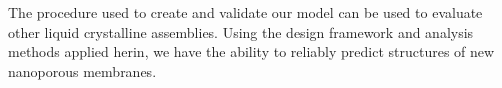 The procedure used to create and validate our model can be used
to evaluate other liquid crystalline assemblies. Using the design 
framework and analysis methods applied herin, we have the ability 
to reliably predict structures of new nanoporous membranes.
